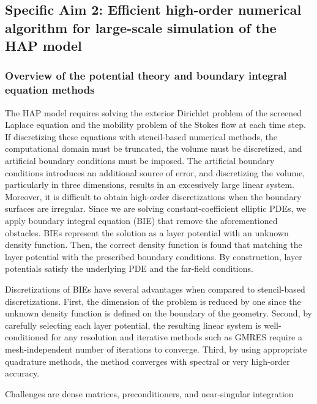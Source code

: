 \subsection{Specific Aim 2: Efficient high-order numerical algorithm for
large-scale simulation of the HAP model}
\label{subsec:specific_aim_2}
\subsubsection{Overview of the potential theory and boundary integral
equation methods} 
The HAP model requires solving the exterior Dirichlet problem of the
screened Laplace equation and the mobility problem of the Stokes flow at
each time step. If discretizing these equations with stencil-based
numerical methods, the computational domain must be truncated, the
volume must be discretized, and artificial boundary conditions must be
imposed. The artificial boundary conditions introduces an additional
source of error, and discretizing the volume, particularly in three
dimensions, results in an excessively large linear system. Moreover, it
is difficult to obtain high-order discretizations when the boundary
surfaces are irregular. Since we are solving constant-coefficient
elliptic PDEs, we apply boundary integral equation (BIE) that remove the
aforementioned obstacles. BIEs represent the solution as a layer
potential with an unknown density function. Then, the correct density
function is found that matching the layer potential with the prescribed
boundary conditions. By construction, layer potentials satisfy the
underlying PDE and the far-field conditions.

Discretizations of BIEs have several advantages when compared to
stencil-based discretizations. First, the dimension of the problem is
reduced by one since the unknown density function is defined on the
boundary of the geometry. Second, by carefully selecting each layer
potential, the resulting linear system is well-conditioned for any
resolution and iterative methods such as GMRES require a
mesh-independent number of iterations to converge. Third, by using
appropriate quadrature methods, the method converges with spectral or
very high-order accuracy.

Challenges are dense matrices, preconditioners, and near-singular
integration



